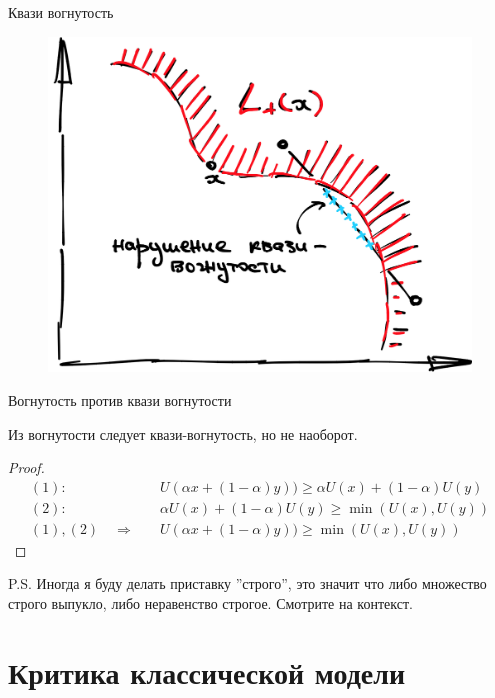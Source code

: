 \documentclass{beamer}
\begin{document}
\begin{frame}{Квази вогнутость}

\begin{figure}[hbt]
\centering
\includegraphics[width=.8 \textwidth]{not_quasi.png}
\end{figure}

\end{frame}

\begin{frame}{Вогнутость против квази вогнутости}

\begin{lemma}
Из вогнутости следует квази-вогнутость, но не наоборот.
\end{lemma}

\begin{proof}
\begin{align*} 
(1) : & \quad U(\alpha x + (1-\alpha) y)) \geqslant \alpha U(x) + (1-\alpha) U(y) \\
(2) : & \quad \alpha U(x) + (1-\alpha) U(y) \geqslant \min (U(x), U(y))\\
(1), (2) \quad \Rightarrow & \quad U(\alpha x + (1-\alpha) y)) \geqslant \min (U(x), U(y))
\end{align*}
\end{proof}

P.S. Иногда я буду делать приставку ''строго'', это значит что либо множество строго выпукло, либо неравенство строгое. Смотрите на контекст.

\end{frame}

\section{Критика классической модели}
\end{document}
